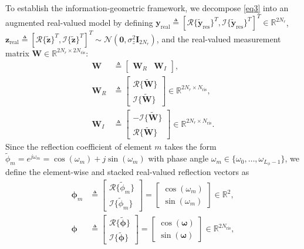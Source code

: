 \documentclass[conference]{IEEEtran}
\begin{document}
To establish the information-geometric framework, we decompose \eqref{eq3} into an augmented real-valued model by defining $\mathbf{y}_{\mathrm{real}} \triangleq [\mathcal{R}\{\tilde{\mathbf{y}}_{\mathrm{res}}\}^T, \mathcal{I}\{\tilde{\mathbf{y}}_{\mathrm{res}}\}^T]^T \in \mathbb{R}^{2N_r}$, $\mathbf{z}_{\mathrm{real}} \triangleq [\mathcal{R}\{\tilde{\mathbf{z}}\}^T, \mathcal{I}\{\tilde{\mathbf{z}}\}^T]^T \sim \mathcal{N}(\mathbf{0}, \sigma_z^2 \mathbf{I}_{2N_r})$, and the real-valued measurement matrix $\mathbf{W} \in \mathbb{R}^{2N_r \times 2N_{\mathrm{ris}}}$:
\begin{align}
	\mathbf{W} &\triangleq \begin{bmatrix}
		\mathbf{W}_R & \mathbf{W}_I
	\end{bmatrix}, \nonumber \\
	\mathbf{W}_R &\triangleq \begin{bmatrix} \mathcal{R}\{\tilde{\mathbf{W}}\} \\ \mathcal{I}\{\tilde{\mathbf{W}}\} \end{bmatrix} \in \mathbb{R}^{2N_r \times N_{\mathrm{ris}}}, \nonumber \\ 
	\mathbf{W}_I &\triangleq \begin{bmatrix} -\mathcal{I}\{\tilde{\mathbf{W}}\} \\ \mathcal{R}\{\tilde{\mathbf{W}}\} \end{bmatrix} \in \mathbb{R}^{2N_r \times N_{\mathrm{ris}}}.
\end{align}
Since the reflection coefficient of element $m$ takes the form $\tilde{\phi}_m = e^{j\omega_m} = \cos(\omega_m) + j\sin(\omega_m)$ with phase angle $\omega_m \in \{\omega_0, \dots, \omega_{L_{\phi}-1}\}$, we define the element-wise and stacked real-valued reflection vectors as
\begin{align}
	\boldsymbol{\phi}_m &\triangleq \begin{bmatrix}
		\mathcal{R}\{\tilde{\phi}_m\} \\
		\mathcal{I}\{\tilde{\phi}_m\}
	\end{bmatrix}=\begin{bmatrix}
		\cos(\omega_m) \\
		\sin(\omega_m)
	\end{bmatrix} \in \mathbb{R}^2, \\
	\boldsymbol{\phi} &\triangleq \begin{bmatrix}
		\mathcal{R}\{\tilde{\boldsymbol{\phi}}\} \\
		\mathcal{I}\{\tilde{\boldsymbol{\phi}}\}
	\end{bmatrix}
	= \begin{bmatrix}
		\cos(\boldsymbol{\omega}) \\
		\sin(\boldsymbol{\omega})
	\end{bmatrix} \in \mathbb{R}^{2N_\mathrm{ris}},
\end{align}
\end{document}
